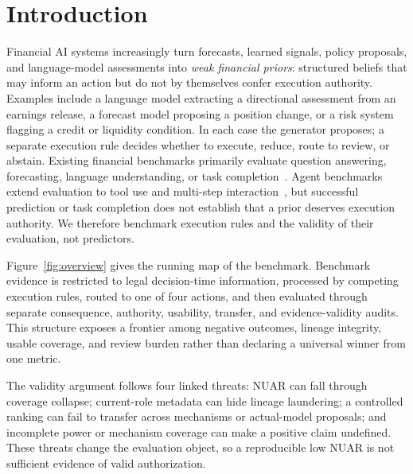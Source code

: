 \section{Introduction}

Financial AI systems increasingly turn forecasts, learned signals, policy proposals, and language-model assessments into \emph{weak financial priors}: structured beliefs that may inform an action but do not by themselves confer execution authority. Examples include a language model extracting a directional assessment from an earnings release, a forecast model proposing a position change, or a risk system flagging a credit or liquidity condition. In each case the generator proposes; a separate execution rule decides whether to execute, reduce, route to review, or abstain. Existing financial benchmarks primarily evaluate question answering, forecasting, language understanding, or task completion~\cite{chen2021finqa,xie2023pixiu,xie2024finben,wu2023bloomberggpt,yang2023fingpt}. Agent benchmarks extend evaluation to tool use and multi-step interaction~\cite{liu2023agentbench,zhou2023webarena,qin2023toolllm,mialon2023gaia}, but successful prediction or task completion does not establish that a prior deserves execution authority. We therefore benchmark execution rules and the validity of their evaluation, not predictors.

Figure~\ref{fig:overview} gives the running map of the benchmark. Benchmark evidence is restricted to legal decision-time information, processed by competing execution rules, routed to one of four actions, and then evaluated through separate consequence, authority, usability, transfer, and evidence-validity audits. This structure exposes a frontier among negative outcomes, lineage integrity, usable coverage, and review burden rather than declaring a universal winner from one metric.

The validity argument follows four linked threats: NUAR can fall through coverage collapse; current-role metadata can hide lineage laundering; a controlled ranking can fail to transfer across mechanisms or actual-model proposals; and incomplete power or mechanism coverage can make a positive claim undefined. These threats change the evaluation object, so a reproducible low NUAR is not sufficient evidence of valid authorization.

